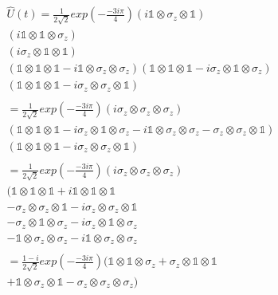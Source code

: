 \begin{multline*}
\hat{U} (t) = \frac{1}{2 \sqrt{2}}exp(-\frac{-3 i \pi}{4})
(i \mathbb{1} \otimes \sigma_{z} \otimes \mathbb{1}) \\
(i \mathbb{1} \otimes \mathbb{1} \otimes \sigma_{z}) \\
(i \sigma_{z} \otimes \mathbb{1} \otimes \mathbb{1}) \\
(\mathbb{1} \otimes \mathbb{1} \otimes \mathbb{1} - i \mathbb{1} \otimes \sigma_{z} \otimes \sigma_{z})
(\mathbb{1} \otimes \mathbb{1} \otimes \mathbb{1} - i \sigma_{z} \otimes \mathbb{1} \otimes \sigma_{z}) \\
(\mathbb{1} \otimes \mathbb{1} \otimes \mathbb{1} - i \sigma_{z} \otimes \sigma_{z} \otimes \mathbb{1}) \\ \\
= \frac{1}{2 \sqrt{2}}exp(-\frac{-3 i \pi}{4})
(i \sigma_{z} \otimes \sigma_{z} \otimes \sigma_{z}) \\
(\mathbb{1} \otimes \mathbb{1} \otimes \mathbb{1}
- i \sigma_{z} \otimes \mathbb{1} \otimes \sigma_{z}
- i \mathbb{1} \otimes \sigma_{z} \otimes \sigma_{z}
- \sigma_{z} \otimes \sigma_{z} \otimes \mathbb{1}) \\
(\mathbb{1} \otimes \mathbb{1} \otimes \mathbb{1} - i \sigma_{z} \otimes \sigma_{z} \otimes \mathbb{1}) \\ \\
= \frac{1}{2 \sqrt{2}}exp(-\frac{-3 i \pi}{4})
(i \sigma_{z} \otimes \sigma_{z} \otimes \sigma_{z}) \\
(\mathbb{1} \otimes \mathbb{1} \otimes \mathbb{1}
+ i \mathbb{1} \otimes \mathbb{1} \otimes \mathbb{1} \\
- \sigma_{z} \otimes \sigma_{z} \otimes \mathbb{1}
- i \sigma_{z} \otimes \sigma_{z} \otimes \mathbb{1} \\
- \sigma_{z} \otimes \mathbb{1} \otimes \sigma_{z} 
- i \sigma_{z} \otimes \mathbb{1} \otimes \sigma_{z} \\
- \mathbb{1} \otimes \sigma_{z} \otimes \sigma_{z}
- i \mathbb{1} \otimes \sigma_{z} \otimes \sigma_{z} \\ \\
= \frac{1 - i}{2 \sqrt{2}}exp(-\frac{-3 i \pi}{4})
(\mathbb{1} \otimes \mathbb{1} \otimes \sigma_{z}
+ \sigma_{z} \otimes \mathbb{1} \otimes \mathbb{1} \\
+ \mathbb{1} \otimes \sigma_{z} \otimes \mathbb{1}
- \sigma_{z} \otimes \sigma_{z} \otimes \sigma_{z}) \\
\end{multline*}

